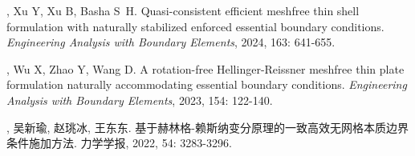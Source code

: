 \vspace{-50pt}
\begin{thebibliography}{1}
	\providecommand{\bibauthor}[1]{#1}
	\providecommand{\bibeditor}[1]{#1}
	\providecommand{\bibtranslator}[1]{#1}
	\providecommand{\bibtitle}[1]{#1}
	\providecommand{\bibbooktitle}[1]{#1}
	\providecommand{\bibjournal}[1]{#1}
	\providecommand{\bibmark}[1]{#1}
	\providecommand{\bibcountry}[1]{#1}
	\providecommand{\bibpatentid}[1]{#1}
	\providecommand{\bibedition}[1]{#1}
	\providecommand{\biborganization}[1]{#1}
	\providecommand{\bibaddress}[1]{#1}
	\providecommand{\bibpublisher}[1]{#1}
	\providecommand{\bibinstitution}[1]{#1}
	\providecommand{\bibschool}[1]{#1}
	\providecommand{\bibvolume}[1]{#1}
	\providecommand{\bibnumber}[1]{#1}
	\providecommand{\bibversion}[1]{#1}
	\providecommand{\bibpages}[1]{#1}
	\providecommand{\bibmodifydate}[1]{#1}
	\providecommand{\bibcitedate}[1]{#1}
	\providecommand{\bibyear}[1]{#1}
	\providecommand{\bibdate}[1]{#1}
	\providecommand{\biburl}[1]{\newline\url{#1}}

	, Xu Y, Xu B, Basha S~H.
	\newblock Quasi-consistent efficient meshfree thin shell formulation with
	  naturally stabilized enforced essential boundary conditions.
	\newblock \emph{Engineering Analysis with Boundary Elements}, 2024, 163:
	  641-655.

	, Wu X, Zhao Y, Wang D.
	\newblock A rotation-free {{Hellinger-Reissner}} meshfree thin plate
	  formulation naturally accommodating essential boundary conditions.
	\newblock \emph{Engineering Analysis with Boundary Elements}, 2023, 154:
	  122-140.

	, 吴新瑜, 赵珧冰, 王东东.
	\newblock
	  {基于赫林格-赖斯纳变分原理的一致高效无网格本质边界条件施加方法}.
	\newblock 力学学报, 2022, 54: 3283-3296.

\end{thebibliography}

